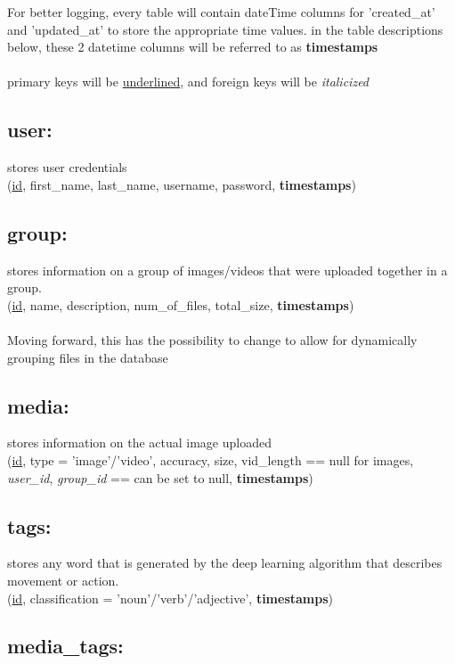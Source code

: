 \documentclass{scrreprt}
\begin{document}
For better logging, every table will contain dateTime columns for 'created\_at' and 'updated\_at' to store the appropriate time values. in the table descriptions below, these 2 datetime columns will be referred to as \textbf{timestamps}
\\\\
primary keys will be \underline{underlined}, and foreign keys will be \textit{italicized}

\subsection{user:}

stores user credentials
\\
(\underline{id}, first\_name, last\_name, username, password, \textbf{timestamps})

\subsection{group:}

stores information on a group of images/videos that were uploaded together in a group.
\\
(\underline{id}, name, description, num\_of\_files, total\_size, \textbf{timestamps})
\\\\
Moving forward, this has the possibility to change to allow for dynamically grouping files in the database


\subsection{media:}

stores information on the actual image uploaded
\\
(\underline{id}, type = 'image'/'video', accuracy, size, vid\_length == null for images, \textit{user\_id}, \textit{group\_id} == can be set to null, \textbf{timestamps})


\subsection{tags:}

stores any word that is generated by the deep learning algorithm that describes movement or action.
\\
(\underline{id}, classification = 'noun'/'verb'/'adjective', \textbf{timestamps})


\subsection{media\_tags:}
\end{document}
